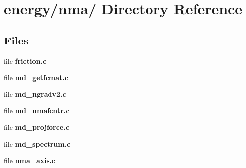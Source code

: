 \section{energy/nma/ Directory Reference}
\label{dir_245dbc79da07e0348448d68882587955}
\subsection*{Files}
\begin{CompactItemize}
\item 
file {\bf friction.c}
\item 
file {\bf md\_\-getfcmat.c}
\item 
file {\bf md\_\-ngradv2.c}
\item 
file {\bf md\_\-nmafcntr.c}
\item 
file {\bf md\_\-projforce.c}
\item 
file {\bf md\_\-spectrum.c}
\item 
file {\bf nma\_\-axis.c}
\end{CompactItemize}
